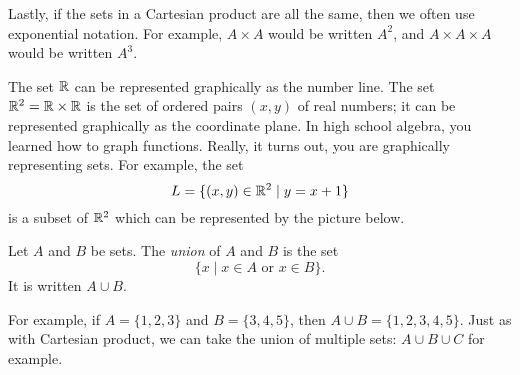 \documentclass{tufte-book}
\begin{document}
Lastly, if the sets in a Cartesian product are all the same, then we often use exponential notation. For example, $A \times A$ would be written $A^2$, and $A \times A \times A$ would be written $A^3$.

\begin{example}
  The set $\mathbb{R}$ can be represented graphically as the number line. The set $\mathbb{R}^2 = \mathbb{R} \times \mathbb{R}$ is the set of ordered pairs $(x, y)$ of real numbers; it can be represented graphically as the coordinate plane. In high school algebra, you learned how to graph functions. Really, it turns out, you are graphically representing sets. For example, the set
  \[
  L = \{(x,y) \in \mathbb{R}^2 \mid y = x + 1\}
  \]
  is a subset of $\mathbb{R}^2$ which can be represented by the picture below.
    \begin{center}
  \end{center}

\end{example}

\begin{definition}
  Let $A$ and $B$ be sets. The \emph{union} of $A$ and $B$ is the set
  \[
  \{x \mid x \in A \text{ or } x \in B\}.
  \]
  It is written $A \cup B$.
\end{definition}
For example, if $A = \{1, 2, 3\}$ and $B = \{3, 4, 5\}$, then $A \cup B = \{1, 2, 3, 4, 5\}$. Just as with Cartesian product, we can take the union of multiple sets: $A \cup B \cup C$ for example. 
\end{document}
